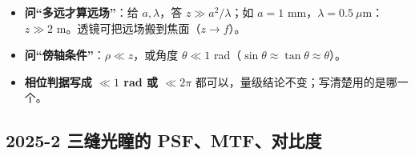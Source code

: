 \begin{warn}[变式]
\begin{itemize}
\item \textbf{问“多远才算远场”}：给 $a,\lambda$，答 $z\gg a^2/\lambda$；如 $a=1$ mm，$\lambda=0.5\ \mu$m：$z\gg2$ m。透镜可把远场搬到焦面（$z\to f$）。
\item \textbf{问“傍轴条件”}：$\rho\ll z$，或角度 $\theta\ll1$ rad（$\sin\theta\approx\tan\theta\approx\theta$）。
\item \textbf{相位判据写成 $\ll1$ rad 或 $\ll2\pi$} 都可以，量级结论不变；写清楚用的是哪一个。
\end{itemize}
\end{warn}

\subsection{2025-2 三缝光瞳的 PSF、MTF、对比度}\label{ex:2025-2}
\label{rd:2025-2}
